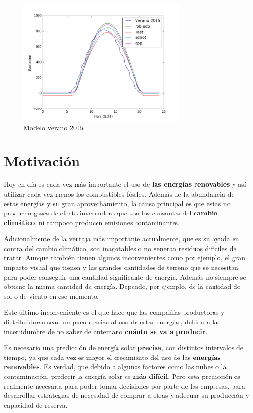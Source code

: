 \begin{figure}[htb]%
	
	\begin{center}
		\includegraphics[height=2.5in]{figures/verano2015.png}
		\caption{Modelo verano 2015}
	\end{center}
    
    \label{figure1}
\end{figure}

\section{Motivación}
\label{makereference1.1}

Hoy en día es cada vez más importante el uso de \textbf{las energías renovables} y así utilizar cada vez menos los combustibles fósiles.
Además de la abundancia de estas energías y su gran aprovechamiento, la causa principal es que estas no producen gases de efecto invernadero que son los causantes del \textbf{cambio climático}, ni tampoco producen emisiones contaminantes. 

Adicionalmente de la ventaja más importante actualmente, que es su ayuda en contra del cambio climático, son inagotables o no generan residuos difíciles de tratar. 
Aunque también tienen algunos inconvenientes como por ejemplo, el gran impacto visual que tienen y las grandes cantidades de terreno que se necesitan para poder conseguir una cantidad significante de energía. Además no siempre se obtiene la misma cantidad de energía. Depende, por ejemplo, de la cantidad de sol o de viento en ese momento.

Este último inconveniente es el que hace que las compañías productoras y distribuidoras sean un poco reacias al uso de estas energías, debido a la incertidumbre de no saber de antemano \textbf{cuánto se va a producir}.

Es necesario una predicción de energía solar \textbf{precisa}, con distintos intervalos de tiempo, ya que cada vez es mayor el crecimiento del uso de las \textbf{energías renovables}. 
Es verdad, que debido a algunos factores como las nubes o la contaminación, predecir la energía solar es \textbf{más difícil}.
Pero esta predicción es realmente necesaria para poder tomar decisiones por parte de las empresas, para desarrollar estrategias de necesidad de comprar a otras y adecuar su producción y capacidad de reserva.

